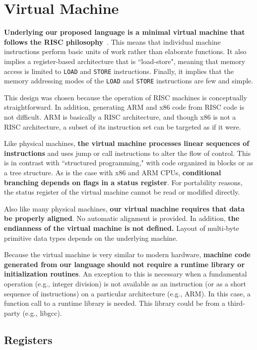 \section{Virtual Machine}

\textbf{Underlying our proposed language is a
minimal virtual machine that follows the RISC philosophy}~\cite{patterson1985reduced}.
This means that individual machine instructions
perform basic units of work rather than elaborate functions.
It also implies a register-based architecture that
is ``load-store", meaning that memory access is limited to
\texttt{LOAD} and \texttt{STORE} instructions.
Finally, it implies that the memory addressing modes of the \texttt{LOAD} and
\texttt{STORE} instructions are few and simple.

This design was chosen because the operation of
RISC machines is conceptually straightforward. In addition,
generating ARM and x86 code from RISC code is not difficult.
ARM is basically a RISC architecture, and though x86 is not a RISC architecture,
a subset of its instruction set can be targeted as if it were.

Like physical machines, \textbf{the virtual machine processes
linear sequences of instructions} and uses jump or call instructions
to alter the flow of control. This is in contrast with ``structured programming,"
with code organized in blocks or as a tree structure.
As is the case with x86 and ARM CPUs, \textbf{conditional branching depends on flags in
a status register}. For portability reasons, the status register
of the virtual machine cannot be read or modified directly.

Also like many physical machines, \textbf{our virtual machine requires that data be
properly aligned}. No automatic alignment is provided.
In addition, \textbf{the endianness of the virtual machine is not defined.}
Layout of multi-byte primitive data types depends on the underlying machine.

Because the virtual machine is very similar to modern hardware,
\textbf{machine code generated from our language should not require a
runtime library or initialization routines}. An exception to this is necessary
when a fundamental operation (e.g., integer division) is not available as
an instruction (or as a short sequence of instructions) on a particular
architecture (e.g., ARM).  In this case, a function call to a runtime
library is needed. This library could be from a third-party (e.g., libgcc).

\subsection{Registers}

